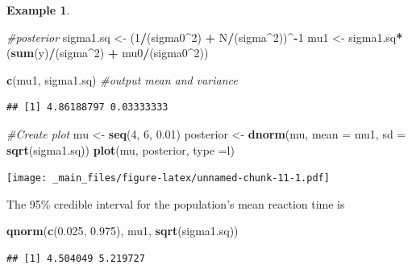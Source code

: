 \documentclass[
]{book}
\newenvironment{Shaded}{\begin{snugshade}}{\end{snugshade}}
\newcommand{\AttributeTok}[1]{\textcolor[rgb]{0.13,0.29,0.53}{#1}}
\newcommand{\CommentTok}[1]{\textcolor[rgb]{0.56,0.35,0.01}{\textit{#1}}}
\newcommand{\DecValTok}[1]{\textcolor[rgb]{0.00,0.00,0.81}{#1}}
\newcommand{\FloatTok}[1]{\textcolor[rgb]{0.00,0.00,0.81}{#1}}
\newcommand{\FunctionTok}[1]{\textcolor[rgb]{0.13,0.29,0.53}{\textbf{#1}}}
\newcommand{\NormalTok}[1]{#1}
\newcommand{\OtherTok}[1]{\textcolor[rgb]{0.56,0.35,0.01}{#1}}
\newcommand{\SpecialCharTok}[1]{\textcolor[rgb]{0.81,0.36,0.00}{\textbf{#1}}}
\newcommand{\StringTok}[1]{\textcolor[rgb]{0.31,0.60,0.02}{#1}}
\theoremstyle{definition}
\theoremstyle{definition}
\newtheorem{example}{Example}[chapter]
\theoremstyle{definition}
\theoremstyle{definition}
\theoremstyle{remark}
\begin{document}
\begin{example}
\begin{Shaded}
\begin{Highlighting}[]
\CommentTok{\#posterior}
\NormalTok{sigma1.sq }\OtherTok{\textless{}{-}}\NormalTok{ (}\DecValTok{1}\SpecialCharTok{/}\NormalTok{(sigma0}\SpecialCharTok{\^{}}\DecValTok{2}\NormalTok{)  }\SpecialCharTok{+}\NormalTok{ N}\SpecialCharTok{/}\NormalTok{(sigma}\SpecialCharTok{\^{}}\DecValTok{2}\NormalTok{))}\SpecialCharTok{\^{}{-}}\DecValTok{1}
\NormalTok{mu1       }\OtherTok{\textless{}{-}}\NormalTok{ sigma1.sq}\SpecialCharTok{*}\NormalTok{(}\FunctionTok{sum}\NormalTok{(y)}\SpecialCharTok{/}\NormalTok{(sigma}\SpecialCharTok{\^{}}\DecValTok{2}\NormalTok{) }\SpecialCharTok{+}\NormalTok{ mu0}\SpecialCharTok{/}\NormalTok{(sigma0}\SpecialCharTok{\^{}}\DecValTok{2}\NormalTok{))}

\FunctionTok{c}\NormalTok{(mu1, sigma1.sq) }\CommentTok{\#output mean and variance}
\end{Highlighting}
\end{Shaded}

\begin{verbatim}
## [1] 4.86188797 0.03333333
\end{verbatim}

\begin{Shaded}
\begin{Highlighting}[]
\CommentTok{\#Create plot}
\NormalTok{mu }\OtherTok{\textless{}{-}} \FunctionTok{seq}\NormalTok{(}\DecValTok{4}\NormalTok{, }\DecValTok{6}\NormalTok{, }\FloatTok{0.01}\NormalTok{)}
\NormalTok{posterior }\OtherTok{\textless{}{-}} \FunctionTok{dnorm}\NormalTok{(mu, }\AttributeTok{mean =}\NormalTok{ mu1, }\AttributeTok{sd =} \FunctionTok{sqrt}\NormalTok{(sigma1.sq))}
\FunctionTok{plot}\NormalTok{(mu, posterior, }\AttributeTok{type =}\StringTok{\textquotesingle{}l\textquotesingle{}}\NormalTok{)}
\end{Highlighting}
\end{Shaded}

\texttt{[image: \_main\_files/figure-latex/unnamed-chunk-11-1.pdf]}

The 95\% credible interval for the population's mean reaction time is

\begin{Shaded}
\begin{Highlighting}[]
\FunctionTok{qnorm}\NormalTok{(}\FunctionTok{c}\NormalTok{(}\FloatTok{0.025}\NormalTok{, }\FloatTok{0.975}\NormalTok{), mu1, }\FunctionTok{sqrt}\NormalTok{(sigma1.sq))}
\end{Highlighting}
\end{Shaded}

\begin{verbatim}
## [1] 4.504049 5.219727
\end{verbatim}

\end{example}
\end{document}

